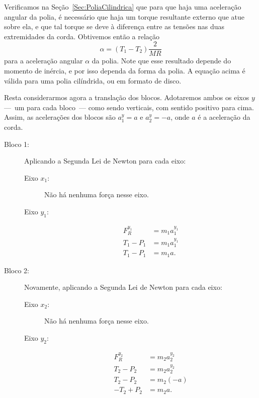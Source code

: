 Verificamos na Seção~\ref{Sec:PoliaCilindrica} que para que haja uma aceleração angular da polia, é necessário que haja um torque resultante externo que atue sobre ela, e que tal torque se deve à diferença entre as tensões nas duas extremidades da corda. Obtivemos então a relação
\begin{equation}
    \alpha = (T_1 - T_2) \frac{2}{MR}
\end{equation}
%
para a aceleração angular $\alpha$ da polia. Note que esse resultado depende do momento de inércia, e por isso dependa da forma da polia. A equação acima é válida para uma polia cilíndrida, ou em formato de disco.

Resta considerarmos agora a translação dos blocos. Adotaremos ambos os eixos $y$ ---~um para cada bloco~--- como sendo verticais, com sentido positivo para cima. Assim, as acelerações dos blocos são $a_1^y = a$ e $a_2^y = -a$, onde $a$ é a aceleração da corda.
\begin{description}
    \item[Bloco 1:] Aplicando a Segunda Lei de Newton para cada eixo:
        \begin{description}
            \item[Eixo $x_1$:] Não há nenhuma força nesse eixo.
            \item[Eixo $y_1$:]
                \begin{align}
                    F_R^{y_1} &= m_1 a_1^{y_1} \\
                    T_1 - P_1 &= m_1 a_1^{y_1} \\
                    T_1 - P_1 &= m_1 a.
                \end{align}
        \end{description}
    \item[Bloco 2:] Novamente, aplicando a Segunda Lei de Newton para cada eixo:
        \begin{description}
            \item[Eixo $x_2$:] Não há nenhuma força nesse eixo.
            \item[Eixo $y_2$:]
                \begin{align}
                    F_R^{y_2} &= m_2 a_2^{y_2} \\
                    T_2 - P_2 &= m_2 a_2^{y_2} \\
                    T_2 - P_2 &= m_2 (-a) \\
                    - T_2 + P_2 &= m_2 a.
                \end{align}
        \end{description}
\end{description}


